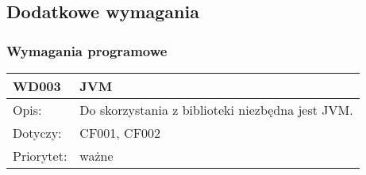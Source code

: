 \subsection{Dodatkowe wymagania}









\subsubsection{Wymagania programowe}


\begin{center}

\begin{tabular}{|m{3cm}|m{9cm}|} \hline

WD003 & JVM \\ \hline
Opis: & Do skorzystania z biblioteki niezbędna jest JVM.\\ \hline
Dotyczy: & CF001, CF002 \\ \hline
Priorytet: & ważne \\ \hline

\end{tabular}

\end{center}

